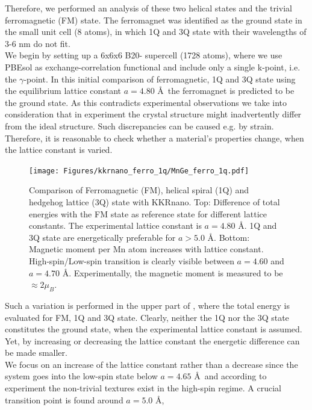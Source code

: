 \documentclass [a4paper, 12pt]{article}
\begin{document}
Therefore, we performed
an analysis of these two helical states and the trivial ferromagnetic (FM) state.
The ferromagnet was identified as the ground state in the small unit cell (8 atoms), 
in which 1Q and 3Q state with their wavelengths of
3-6 nm do not fit.
\\
We begin by setting up a 6x6x6 B20- supercell (1728 atoms), where we use PBEsol 
as exchange-correlation functional
and include only a single k-point, i.e. the $\gamma$-point.
In this initial comparison of ferromagnetic, 1Q and 3Q state using the equilibrium lattice constant
$a=4.80$ \AA \, the ferromagnet is predicted to be the ground state.
As this contradicts experimental observations we take into consideration that
in experiment the crystal structure might inadvertently differ from the ideal structure.
Such discrepancies can be caused e.g. by strain.
\\
Therefore, it is reasonable to check whether a material's properties change, when the
lattice constant is varied.
\begin{figure}[h]
\begin{center}
 \texttt{[image: Figures/kkrnano\_ferro\_1q/MnGe\_ferro\_1q.pdf]}
\end{center}
\caption{
	Comparison of Ferromagnetic (FM), helical spiral (1Q) and hedgehog lattice (3Q) state with KKRnano.
	Top: Difference of total energies with the FM state as reference state for different lattice constants. 
	The experimental lattice constant is $a = 4.80$ \AA. 1Q and 3Q state are energetically preferable 
	for $a > 5.0$ \AA. Bottom: Magnetic moment per Mn atom increases with lattice constant. 
	High-spin/Low-spin transition is clearly visible between $a = 4.60$ and $a = 4.70$ \AA.
	Experimentally, the magnetic moment is measured to be $\approx 2 \mu_{B}$.
	}
\label{fig:MnGe_ferro_1q}
\end{figure}
Such a variation is performed in the upper part of , where
the total energy is evaluated for FM, 1Q and 3Q state.
Clearly, neither the 1Q nor the 3Q state constitutes the ground state,
when the experimental lattice constant is assumed.
Yet, by increasing or decreasing the lattice constant the energetic difference can be made
smaller.
\\
We focus on an increase of the lattice constant rather than a decrease since 
the system goes into the low-spin state below $a=4.65$ \AA \, and according to experiment
the non-trivial textures
exist in the high-spin regime.
A crucial transition point is found around $a=5.0$ \AA,
\end{document}
